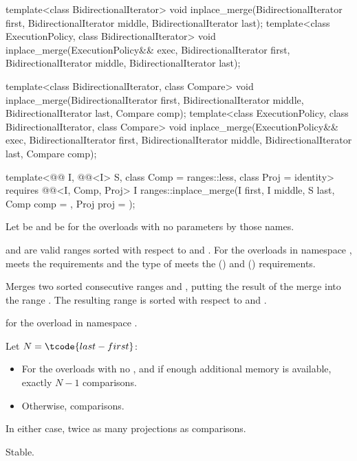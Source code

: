 %
\begin{itemdecl}
template<class BidirectionalIterator>
  void inplace_merge(BidirectionalIterator first,
                     BidirectionalIterator middle,
                     BidirectionalIterator last);
template<class ExecutionPolicy, class BidirectionalIterator>
  void inplace_merge(ExecutionPolicy&& exec,
                     BidirectionalIterator first,
                     BidirectionalIterator middle,
                     BidirectionalIterator last);

template<class BidirectionalIterator, class Compare>
  void inplace_merge(BidirectionalIterator first,
                     BidirectionalIterator middle,
                     BidirectionalIterator last, Compare comp);
template<class ExecutionPolicy, class BidirectionalIterator, class Compare>
  void inplace_merge(ExecutionPolicy&& exec,
                     BidirectionalIterator first,
                     BidirectionalIterator middle,
                     BidirectionalIterator last, Compare comp);

template<@@ I, @@<I> S, class Comp = ranges::less,
         class Proj = identity>
  requires @@<I, Comp, Proj>
  I ranges::inplace_merge(I first, I middle, S last, Comp comp = {}, Proj proj = {});
\end{itemdecl}

\begin{itemdescr}
\pnum
Let  be 
and  be 
for the overloads with no parameters by those names.

\pnum
\expects
{} and  are valid ranges
sorted with respect to  and .
For the overloads in namespace ,
 meets
the  requirements and
the type of  meets
the  () and
 () requirements.

\pnum
\effects
Merges two sorted consecutive ranges
 and ,
putting the result of the merge into the range .
The resulting range is sorted with respect to  and .

\pnum
\returns
{} for the overload in namespace .

\pnum
\complexity
Let $N = \tcode{last - first}$:
\begin{itemize}
\item
  For the overloads with no , and
  if enough additional memory is available, exactly $N - 1$ comparisons.
\item
  Otherwise,  comparisons.
\end{itemize}
In either case, twice as many projections as comparisons.

\pnum
\remarks
Stable.
\end{itemdescr}

